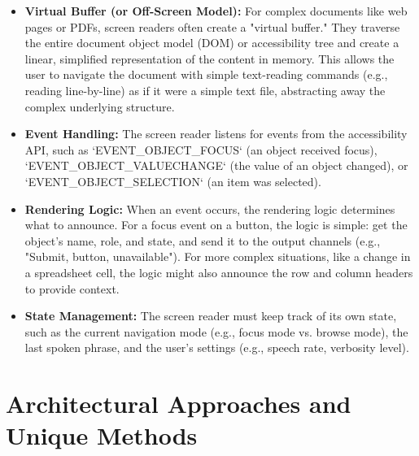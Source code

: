 \begin{itemize}
	\item \textbf{Virtual Buffer (or Off-Screen Model):} For complex documents like web pages or PDFs, screen readers often create a "virtual buffer." They traverse the entire document object model (DOM) or accessibility tree and create a linear, simplified representation of the content in memory. This allows the user to navigate the document with simple text-reading commands (e.g., reading line-by-line) as if it were a simple text file, abstracting away the complex underlying structure.
	\item \textbf{Event Handling:} The screen reader listens for events from the accessibility API, such as `EVENT\_OBJECT\_FOCUS` (an object received focus), `EVENT\_OBJECT\_VALUECHANGE` (the value of an object changed), or `EVENT\_OBJECT\_SELECTION` (an item was selected).
	\item \textbf{Rendering Logic:} When an event occurs, the rendering logic determines what to announce. For a focus event on a button, the logic is simple: get the object's name, role, and state, and send it to the output channels (e.g., "Submit, button, unavailable"). For more complex situations, like a change in a spreadsheet cell, the logic might also announce the row and column headers to provide context.
	\item \textbf{State Management:} The screen reader must keep track of its own state, such as the current navigation mode (e.g., focus mode vs. browse mode), the last spoken phrase, and the user's settings (e.g., speech rate, verbosity level).
\end{itemize}

\section{Architectural Approaches and Unique Methods}
\label{sec:architectural-approaches-and-unique-methods}

